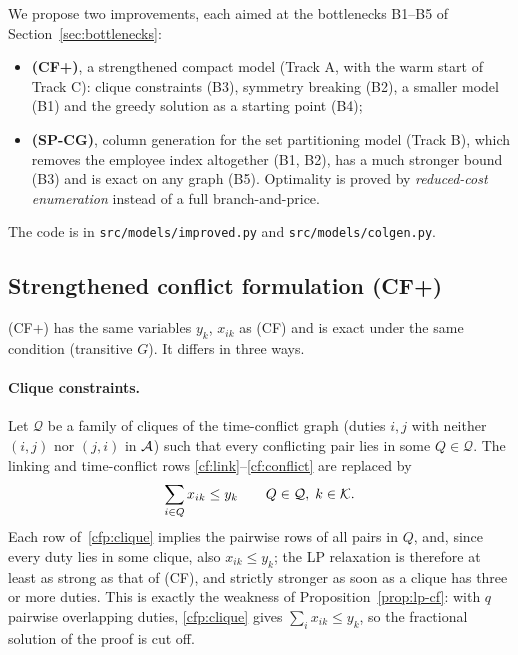 
We propose two improvements, each aimed at the bottlenecks B1--B5 of
Section~\ref{sec:bottlenecks}:
\begin{itemize}[nosep]
  \item \textbf{(CF+)}, a strengthened compact model (Track A, with the warm
    start of Track C): clique constraints (B3), symmetry breaking (B2), a
    smaller model (B1) and the greedy solution as a starting point (B4);
  \item \textbf{(SP-CG)}, column generation for the set partitioning model
    (Track B), which removes the employee index altogether (B1, B2), has a
    much stronger bound (B3) and is exact on any graph (B5). Optimality is
    proved by \emph{reduced-cost enumeration} instead of a full
    branch-and-price.
\end{itemize}
The code is in \texttt{src/models/improved.py} and
\texttt{src/models/colgen.py}.

\subsection{Strengthened conflict formulation (CF+)}
\label{sec:cfp}

(CF+) has the same variables $y_k$, $x_{ik}$ as (CF) and is exact under the
same condition (transitive $G$). It differs in three ways.

\paragraph{Clique constraints.} Let $\mathcal Q$ be a family of cliques of
the time-conflict graph (duties $i,j$ with neither $(i,j)$ nor $(j,i)$ in
$\mathcal{A}$) such that every conflicting pair lies in some $Q\in\mathcal Q$. The
linking and time-conflict rows \eqref{cf:link}--\eqref{cf:conflict} are
replaced by
\begin{equation}\label{cfp:clique}
  \sum_{i\in Q} x_{ik}\le y_k \qquad Q\in\mathcal Q,\; k\in\mathcal{K} .
\end{equation}
Each row of~\eqref{cfp:clique} implies the pairwise rows of all pairs in $Q$,
and, since every duty lies in some clique, also $x_{ik}\le y_k$; the LP
relaxation is therefore at least as strong as that of (CF), and strictly
stronger as soon as a clique has three or more duties. This is exactly the
weakness of Proposition~\ref{prop:lp-cf}: with $q$ pairwise overlapping
duties, \eqref{cfp:clique} gives $\sum_i x_{ik}\le y_k$, so the fractional
solution of the proof is cut off.


